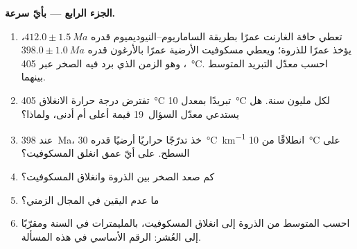 \begin{problem}
\noindent\textbf{الجزء الرابع --- بأيّ سرعة.}
\begin{enumerate}[resume]
\item تعطي حافة الغارنت عمرًا بطريقة الساماريوم--النيوديميوم قدره $412.0 \pm \qty{1.5}{Ma}$، يؤخذ
عمرًا للذروة؛ ويعطي مسكوفيت الأرضية عمرًا بالأرغون قدره $398.0 \pm
\qty{1.0}{Ma}$، وهو الزمن الذي برد فيه الصخر عبر \qty{405}{\celsius}. احسب
معدّل التبريد المتوسط بينهما.
\item تفترض درجة حرارة الانغلاق \qty{405}{\celsius} تبريدًا بمعدل
\qty{10}{\celsius} لكل مليون سنة. هل يستدعي معدّل السؤال~19 قيمة أعلى أم
أدنى، ولماذا؟
\item عند \qty{398}{Ma}، خذ تدرّجًا حراريًا أرضيًا قدره \qty{30}{\celsius\per\km} انطلاقًا من
\qty{10}{\celsius} على السطح. على أيّ عمق انغلق المسكوفيت؟
\item كم صعد الصخر بين الذروة وانغلاق المسكوفيت؟
\item ما عدم اليقين في المجال الزمني؟
\item احسب  المتوسط من الذروة إلى انغلاق المسكوفيت، بالمليمترات
في السنة ومقرّبًا إلى العُشر: الرقم الأساسي في هذه المسألة.
\end{enumerate}
\end{problem}
